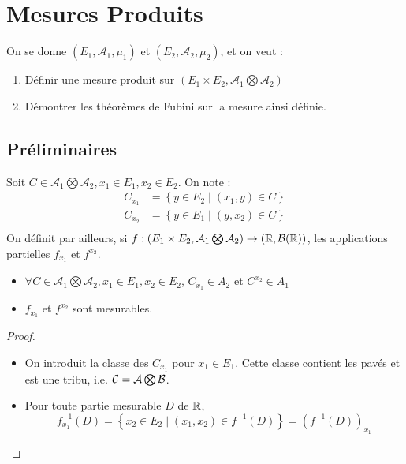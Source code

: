 \documentclass{cours}
\begin{document}
    \section{Mesures Produits}
        On se donne $(E_{1}, \mathcal{A}_{1}, \mu_{1})$ et $(E_{2}, \mathcal{A}_{2}, \mu_{2})$, et on veut :
        \begin{enumerate}
            \item Définir une mesure produit sur $\left(E_{1} \times E_{2}, \mathcal{A}_{1} \bigotimes \mathcal{A}_{2}\right)$
            \item Démontrer les théorèmes de Fubini sur la mesure ainsi définie. 
        \end{enumerate}
        \subsection{Préliminaires}
        \begin{definition}
            Soit $C \in \mathcal{A}_{1} \bigotimes \mathcal{A}_{2}, x_{1} \in E_{1}, x_{2} \in E_{2}$. On note : 
            \[
                \begin{aligned}
                    C_{x_{1}} &= \left\{y \in E_{2}\mid (x_{1}, y) \in C\right\}\\
                    C_{x_{2}} &= \left\{y \in E_{1}\mid (y, x_{2}) \in C\right\}\\
                \end{aligned}
            \]
            On définit par ailleurs, si $f : \left(E_{1} \times E_{2}, \mathcal{A}_{1} \bigotimes \mathcal{A}_{2}\right) \to \left(\mathbb{R}, \mathcal{B}(\mathbb{R})\right)$, les applications partielles $f_{x_{1}}$ et $f^{x_{2}}$.
        \end{definition}
        \begin{lemma}
            \begin{itemize}
                \item $\forall C \in \mathcal{A}_{1} \bigotimes \mathcal{A}_{2}, x_{1} \in E_{1}, x_{2} \in E_{2}$, $C_{x_{1}} \in A_{2}$ et $C^{x_{2}} \in A_{1}$
                \item $f_{x_{1}}$ et $f^{x_{2}}$ sont mesurables.
            \end{itemize}
        \end{lemma}
        \begin{proof}
            \begin{itemize}
                \item On introduit la classe des $C_{x_{1}}$ pour $x_{1} \in E_{1}$. Cette classe contient les pavés et est une tribu, i.e. $\mathcal{C} = \mathcal{A} \bigotimes \mathcal{B}$.
                \item Pour toute partie mesurable $D$ de $\mathbb{R}$, \[f_{x_{1}}^{-1}\left(D\right) = \left\{x_{2} \in E_{2}\mid \left(x_{1}, x_{2}\right)\in f^{-1}\left(D\right)\right\} = \left(f^{-1}(D)\right)_{x_{1}}\]
            \end{itemize}
        \end{proof}
\end{document}
